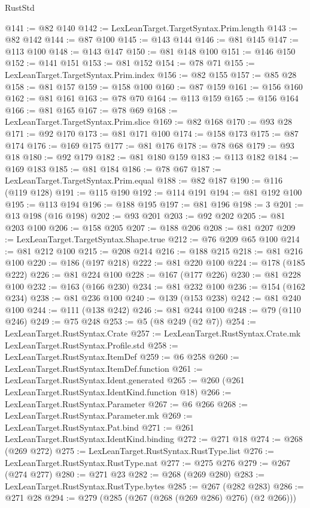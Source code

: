\begin{lexlean}{RustStd}
\begin{coremodule}
{\begin{coremodule}
{{{{{@141 := @82 @140
@142 := LexLeanTarget.TargetSyntax.Prim.length
@143 := @82 @142
@144 := @87 @100
@145 := @143 @144
@146 := @81 @145
@147 := @113 @100
@148 := @143 @147
@150 := @81 @148 @100
@151 := @146 @150
@152 := @141 @151
@153 := @81 @152
@154 := @78 @71
@155 := LexLeanTarget.TargetSyntax.Prim.index
@156 := @82 @155
@157 := @85 @28
@158 := @81 @157
@159 := @158 @100
@160 := @87 @159
@161 := @156 @160
@162 := @81 @161
@163 := @78 @70
@164 := @113 @159
@165 := @156 @164
@166 := @81 @165
@167 := @78 @69
@168 := LexLeanTarget.TargetSyntax.Prim.slice
@169 := @82 @168
@170 := @93 @28
@171 := @92 @170
@173 := @81 @171 @100
@174 := @158 @173
@175 := @87 @174
@176 := @169 @175
@177 := @81 @176
@178 := @78 @68
@179 := @93 @18
@180 := @92 @179
@182 := @81 @180 @159
@183 := @113 @182
@184 := @169 @183
@185 := @81 @184
@186 := @78 @67
@187 := LexLeanTarget.TargetSyntax.Prim.equal
@188 := @82 @187
@190 := @116 (@119 @128)
@191 := @115 @190
@192 := @114 @191
@194 := @81 @192 @100
@195 := @113 @194
@196 := @188 @195
@197 := @81 @196
@198 := 3
@201 := @13 @198 (@16 @198)
@202 := @93 @201
@203 := @92 @202
@205 := @81 @203 @100
@206 := @158 @205
@207 := @188 @206
@208 := @81 @207
@209 := LexLeanTarget.TargetSyntax.Shape.true
@212 := @76 @209 @65 @100
@214 := @81 @212 @100
@215 := @208 @214
@216 := @188 @215
@218 := @81 @216 @100
@220 := @186 (@197 @218)
@222 := @81 @220 @100
@224 := @178 (@185 @222)
@226 := @81 @224 @100
@228 := @167 (@177 @226)
@230 := @81 @228 @100
@232 := @163 (@166 @230)
@234 := @81 @232 @100
@236 := @154 (@162 @234)
@238 := @81 @236 @100
@240 := @139 (@153 @238)
@242 := @81 @240 @100
@244 := @111 (@138 @242)
@246 := @81 @244 @100
@248 := @79 (@110 @246)
@249 := @75 @248
@253 := @5 (@8 @249 (@2 @7))
@254 := LexLeanTarget.RustSyntax.Crate
@257 := LexLeanTarget.RustSyntax.Crate.mk LexLeanTarget.RustSyntax.Profile.std
@258 := LexLeanTarget.RustSyntax.ItemDef
@259 := @6 @258
@260 := LexLeanTarget.RustSyntax.ItemDef.function
@261 := LexLeanTarget.RustSyntax.Ident.generated
@265 := @260 (@261 LexLeanTarget.RustSyntax.IdentKind.function @18)
@266 := LexLeanTarget.RustSyntax.Parameter
@267 := @6 @266
@268 := LexLeanTarget.RustSyntax.Parameter.mk
@269 := LexLeanTarget.RustSyntax.Pat.bind
@271 := @261 LexLeanTarget.RustSyntax.IdentKind.binding
@272 := @271 @18
@274 := @268 (@269 @272)
@275 := LexLeanTarget.RustSyntax.RustType.list
@276 := LexLeanTarget.RustSyntax.RustType.nat
@277 := @275 @276
@279 := @267 (@274 @277)
@280 := @271 @23
@282 := @268 (@269 @280)
@283 := LexLeanTarget.RustSyntax.RustType.bytes
@285 := @267 (@282 @283)
@286 := @271 @28
@294 := @279 (@285 (@267 (@268 (@269 @286) @276) (@2 @266)))
}}}}}
\end{coremodule}}
\end{coremodule}
\end{lexlean}
